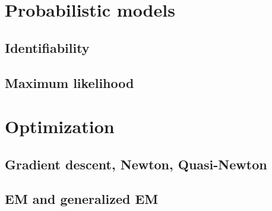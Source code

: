 \section{Probabilistic models}
\subsection{Identifiability}
\subsection{Maximum likelihood}
\section{Optimization}
\subsection{Gradient descent, Newton, Quasi-Newton}
\subsection{EM and generalized EM}
